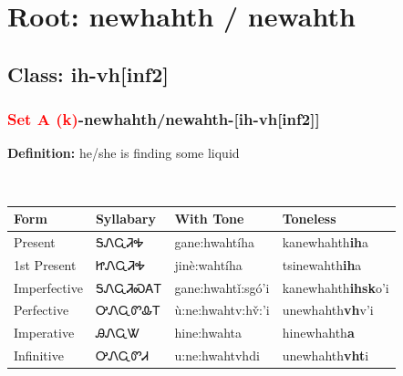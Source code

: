 \needspace{4in}
\section*{Root: newhahth / newahth}
\nopagebreak
{}
\needspace{3in}
\subsection*{Class: ih-vh[inf2]}
\nopagebreak
\needspace{2in}
\subsubsection*{\textcolor{Red}{Set A (k)}{-}\textbf{newhahth/newahth}{-}[ih-vh[inf2]]}
\nopagebreak
\textbf{Definition: } he/she is finding some liquid
\\[0.5em]
\begin{tabularx}{\textwidth}{l X X X}%
\toprule%
\textbf{Form}&\textbf{Syllabary}&\textbf{With Tone}&\textbf{Toneless}\\%
\midrule%
Present&ᎦᏁᏩᏘᎭ&gane:hwahtíha&kanewhahth\textbf{ih}a\\%
1st Present&ᏥᏁᏩᏘᎭ&jinè:wahtíha&tsinewahth\textbf{ih}a\\%
Imperfective&ᎦᏁᏩᏘᏍᎪᎢ&gane:hwahtǐ:sgó’i&kanewhahth\textbf{ihsk}o'i\\%
Perfective&ᎤᏁᏩᏛᎲᎢ&ù:ne:hwahtv:hv̌:’i&unewhahth\textbf{vh}v'i\\%
Imperative&ᎯᏁᏩᏔ&hine:hwahta&hinewhahth\textbf{a}\\%
Infinitive&ᎤᏁᏩᏛᏗ&u:ne:hwahtvhdi&unewhahth\textbf{vht}i\\%
\bottomrule%
\end{tabularx}
\\[1em]